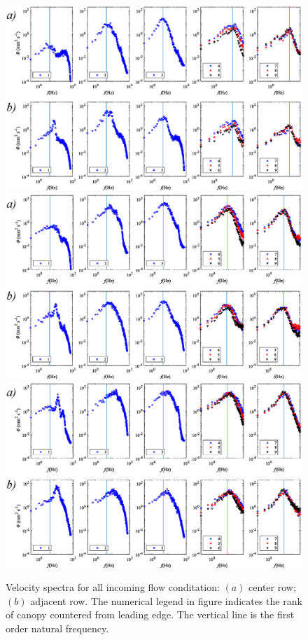 \documentclass[lineno,authoryear]{FLO_v1}%
\theoremstyle{definition}
\begin{document}
\begin{figure}[]
    \centering
         \includegraphics[width=.8\linewidth]{6hz_spectra}
        \includegraphics[width=.8\linewidth]{9hz_spectra}
        \includegraphics[width=.8\linewidth]{12hz_spectra}
    \caption{Velocity spectra for all incoming flow conditation: $(a)$ center row; $(b)$ adjacent row. The numerical legend in figure indicates the rank of canopy countered from leading edge. The vertical line is the first order natural frequency.}
    \label{spectra}
\end{figure}
\end{document}
